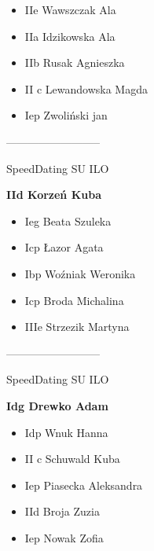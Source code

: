 \documentclass[a4paper,10pt]{article}
\begin{document}
\begin{multicols}{3}
\begin{minipage}[l]{\textwidth}
  \begin{itemize}
    \item IIe Wawszczak Ala
    \item IIa Idzikowska Ala
    \item IIb Rusak Agnieszka
    \item II c Lewandowska Magda
    \item Iep Zwoliński jan

    \end{itemize}



\end{minipage}



\begin{minipage}[l]{\textwidth}
--------------------------

  \footnotesize{SpeedDating SU ILO}

  \bfseries{IId Korzeń Kuba}

  \begin{itemize}
    \item Ieg Beata Szuleka
    \item Icp Łazor Agata
    \item Ibp Woźniak Weronika
    \item Icp Broda Michalina
    \item IIIe Strzezik Martyna

    \end{itemize}



\end{minipage}



\begin{minipage}[l]{\textwidth}
--------------------------

  \footnotesize{SpeedDating SU ILO}

  \bfseries{Idg Drewko Adam}

  \begin{itemize}
    \item Idp Wnuk Hanna
    \item II c Schuwald Kuba
    \item Iep Piasecka Aleksandra
    \item IId Broja Zuzia
    \item Iep Nowak Zofia

    \end{itemize}




\end{minipage}
\end{multicols}
\end{document}

